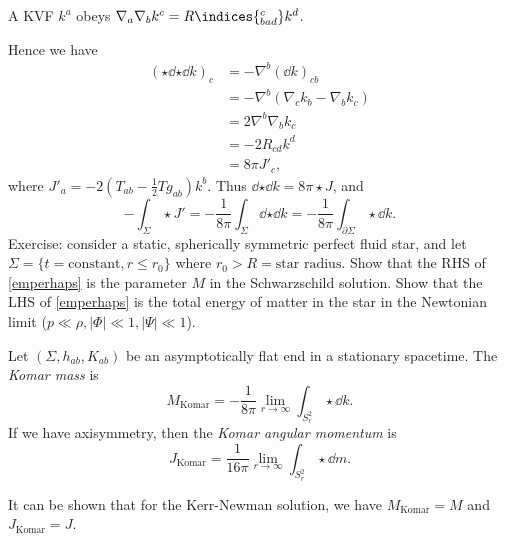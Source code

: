 \documentclass{jknotes}
\begin{document}
\begin{lemma}
    A KVF \(k^a\) obeys \(\nabla_a\nabla_bk^c = R\indices{^c_{bad}}k^d\).
\end{lemma}

Hence we have
\begin{align}
    (\star\dd{\star\dd{k}})_c &= -\nabla^b(\dd{k})_{cb} \\
                              &= -\nabla^b(\nabla_ck_b-\nabla_bk_c) \\
                              &= 2\nabla^b\nabla_bk_c \\
                              &= -2R_{cd} k^d \\
                              &= 8\pi J'_c,
\end{align}
where \(J'_a = -2\left(T_{ab} - \frac{1}{2} T g_{ab}\right) k^b\). Thus \(\dd{\star\dd{k}} = 8\pi \star J\), and
\begin{equation}
    -\int_\Sigma\star J' = -\frac{1}{8\pi}\int_\Sigma \dd{\star\dd{k}} = -\frac{1}{8\pi}\int_{\partial\Sigma} \star \dd{k}.
    \label{emperhaps}
    \tag{\(*\)}
\end{equation}
Exercise: consider a static, spherically symmetric perfect fluid star, and let \(\Sigma = \{t=\text{constant},r\le r_0\}\) where \(r_0 > R = \text{star radius}\). Show that the RHS of \eqref{emperhaps} is the parameter \(M\) in the Schwarzschild solution. Show that the LHS of \eqref{emperhaps} is the total energy of matter in the star in the Newtonian limit (\(p \ll \rho, |\Phi| \ll 1, |\Psi| \ll 1\)).

\begin{defn}
    Let \((\Sigma, h_{ab}, K_{ab})\) be an asymptotically flat end in a stationary spacetime. The \emph{Komar mass} is
    \begin{equation}
        M_{\text{Komar}} = -\frac{1}{8\pi}\lim_{r\to\infty}\int_{S_r^2}\star\dd{k}.
    \end{equation}
    If we have axisymmetry, then the \emph{Komar angular momentum} is
    \begin{equation}
        J_{\text{Komar}} = \frac{1}{16\pi}\lim_{r\to\infty}\int_{S_r^2}\star\dd{m}.
    \end{equation}
\end{defn}
It can be shown that for the Kerr-Newman solution, we have \(M_{\text{Komar}} = M\) and \(J_{\text{Komar}} = J\).
\end{document}
